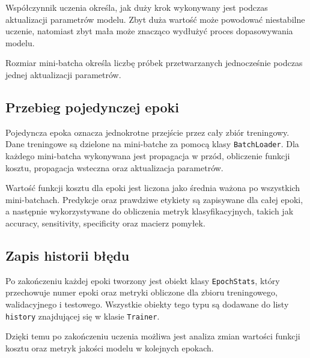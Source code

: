 Współczynnik uczenia określa, jak duży krok wykonywany jest podczas
aktualizacji parametrów modelu. Zbyt duża wartość może powodować niestabilne
uczenie, natomiast zbyt mała może znacząco wydłużyć proces dopasowywania
modelu.

Rozmiar mini-batcha określa liczbę próbek przetwarzanych jednocześnie
podczas jednej aktualizacji parametrów.

\subsection{Przebieg pojedynczej epoki}

Pojedyncza epoka oznacza jednokrotne przejście przez cały zbiór treningowy.
Dane treningowe są dzielone na mini-batche za pomocą klasy
\texttt{BatchLoader}. Dla każdego mini-batcha wykonywana jest propagacja
w przód, obliczenie funkcji kosztu, propagacja wsteczna oraz aktualizacja
parametrów.

Wartość funkcji kosztu dla epoki jest liczona jako średnia ważona po
wszystkich mini-batchach. Predykcje oraz prawdziwe etykiety są zapisywane
dla całej epoki, a następnie wykorzystywane do obliczenia metryk
klasyfikacyjnych, takich jak accuracy, sensitivity, specificity oraz
macierz pomyłek.

\subsection{Zapis historii błędu}

Po zakończeniu każdej epoki tworzony jest obiekt klasy \texttt{EpochStats},
który przechowuje numer epoki oraz metryki obliczone dla zbioru
treningowego, walidacyjnego i testowego. Wszystkie obiekty tego typu są
dodawane do listy \texttt{history} znajdującej się w klasie \texttt{Trainer}.


Dzięki temu po zakończeniu uczenia możliwa jest analiza zmian wartości
funkcji kosztu oraz metryk jakości modelu w kolejnych epokach.